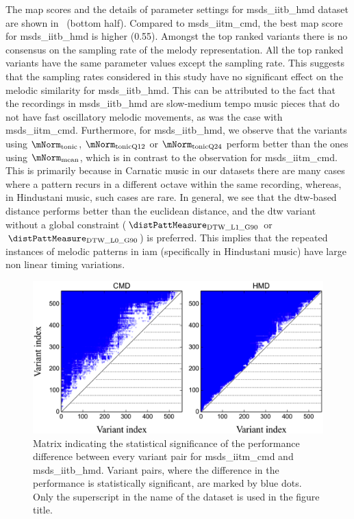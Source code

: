 The \gls{map} scores and the details of parameter settings for \acrshort{msds_iitb_hmd} dataset are shown in~ (bottom half). Compared to \acrshort{msds_iitm_cmd}, the best \gls{map} score for \acrshort{msds_iitb_hmd} is higher (0.55). Amongst the top ranked variants there is no consensus on the sampling rate of the melody representation. All the top ranked variants have the same parameter values except the sampling rate. This suggests that the sampling rates considered in this study have no significant effect on the melodic similarity for \acrshort{msds_iitb_hmd}. This can be attributed to the fact that the recordings in \acrshort{msds_iitb_hmd} are slow-medium tempo music pieces that do not have fast oscillatory melodic movements, as was the case with \acrshort{msds_iitm_cmd}. Furthermore, for \acrshort{msds_iitb_hmd}, we observe that the variants using $\mNorm_{\mathrm{tonic}}$, $\mNorm_{\mathrm{tonicQ12}}$ or $\mNorm_{\mathrm{tonicQ24}}$ perform better than the ones using $\mNorm_{\mathrm{mean}}$, which is in contrast to the observation for \acrshort{msds_iitm_cmd}. This is primarily because in Carnatic music in our datasets there are many cases where a pattern recurs in a different octave within the same recording, whereas, in Hindustani music, such cases are rare. In general, we see that the \gls{dtw}-based distance performs better than the euclidean distance, and the \gls{dtw} variant without a global constraint ($\distPattMeasure_{\mathrm{DTW\_L1\_G90}}$ or $\distPattMeasure_{\mathrm{DTW\_L0\_G90}}$) is preferred. This implies that the repeated instances of melodic patterns in \gls{iam} (specifically in Hindustani music) have large non linear timing variations.

\begin{figure}[h]
	\begin{center}
		\includegraphics[width=\figSizeNinety]{ch06_patterns/figures/SimilarityEvaluation/StatisticalDiff.png}
	\end{center}
	\caption[Matrix indicating the statistical significance of the performance difference between different method variants]{Matrix indicating the statistical significance of the performance difference between every variant pair for \acrshort{msds_iitm_cmd} and \acrshort{msds_iitb_hmd}. Variant pairs, where the difference in the performance is statistically significant, are marked by blue dots. Only the superscript in the name of the dataset is used in the figure title.}
	\label{fig:patterns_statistical_significance_similarity_evaluation}
\end{figure}

